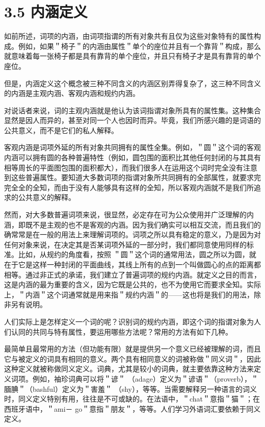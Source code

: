 \section*{3.5 内涵定义}
如前所述，词项的内涵，由词项指谓的所有对象共有且仅为这些对象特有的属性构成。例如，如果＂椅子＂的内涵由属性＂单个的座位并且有一个靠背＂构成，那么就意味着每一张椅子都是具有靠背的单个座位，并且只有椅子才是具有靠背的单个座位。

但是，内涵定义这个概念被三种不同含义的内涵区别弄得复杂了，这三种不同含义的内涵是主观内涵、客观内涵和规约内涵。

对说话者来说，词的主观内涵就是他认为该词指谓对象所具有的属性集。这种集合显然是因人而异的，甚至对同一个人也因时而异。毕竟，我们所感兴趣的是词语的公共意义，而不是它们的私人解释。

客观内涵是词项外延的所有对象共同拥有的属性全集。例如，＂圆＂这个词的客观内涵可以拥有圆的各种普遍特性（例如，圆包围的面积比其他任何封闭的与其具有相等周长的平面图包围的面积都大），而我们很多人在运用这个词时完全没有注意到这些普遍属性。要知道大多数词项的指谓对象所共同拥有的全部属性，就要求完完全全的全知，而由于没有人能够具有这样的全知，所以客观内涵就不是我们所追求的公共意义的解释。

然而，对大多数普遍词项来说，很显然，必定存在可为公众使用并广泛理解的内涵，即既不是主观的也不是客观的内涵。因为我们确实可以相互交流，而且我们的确常常是在一般的用法上来理解词项的。词项之所以具有稳定的意义，乃是因为对任何对象来说，在决定其是否某词项外延的一部分时，我们都同意使用同样的标准。比如，从规约的角度看，按照 ＂圆＂这个词的通常用法，圆之所以为圆，就在于它是这样一种封闭的平面曲线，其线上所有的点到一个叫做圆心的点的距离都相等。通过非正式的承诺，我们建立了普遍词项的规约内涵。就定义之目的而言，这是内涵的最为重要的含义，因为它既是公共的，也不为使用它而要求全知。实际上，＂内涵＂这个词通常就是用来指＂规约内涵＂的——这也将是我们的用法，除非另有说明。

人们实际上是怎样定义一个词的呢？识别词的规约内涵，即这个词的指谓对象为人们认同的共同与特有属性，要运用哪些方法呢？常用的方法有如下几种。

最简单且最常用的方法（但功能有限）就是提供另一个意义已经被理解的词，而且它与被定义的词具有相同的意义。两个具有相同意义的词被称做＂同义词＂，因此这种定义就被称做同义定义。词典，尤其是较小的词典，就主要依靠这种方法来定义词项。例如，袖珍词典可以将＂谚＂ （adage）定义为＂谚语＂（proverb），＂腼腆＂（bashful）定义为＂害羞＂ （shy），等等。当需要解释另一种语言的词义时，同义定义特别有用，往往是不可或缺的。在法语中，＂chat＂意指＂猫＂；在西班牙语中，＂ami－ go＂意指＂朋友＂，等等。人们学习外语词汇要依赖于同义定义。

